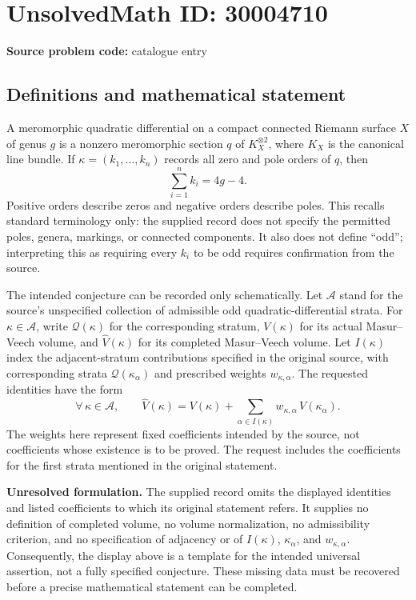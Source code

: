 \documentclass[11pt]{article}
\begin{document}
\section*{UnsolvedMath ID: 30004710}
\textbf{Source problem code:} catalogue entry
\subsection{Definitions and mathematical statement}
A meromorphic quadratic differential on a compact connected Riemann surface \(X\) of genus \(g\) is a nonzero meromorphic section \(q\) of \(K_X^{\otimes 2}\), where \(K_X\) is the canonical line bundle. If \(\kappa=(k_1,\ldots,k_n)\) records all zero and pole orders of \(q\), then
\[
\sum_{i=1}^{n} k_i=4g-4.
\]
Positive orders describe zeros and negative orders describe poles. This recalls standard terminology only: the supplied record does not specify the permitted poles, genera, markings, or connected components. It also does not define ``odd''; interpreting this as requiring every \(k_i\) to be odd requires confirmation from the source.

The intended conjecture can be recorded only schematically. Let \(\mathcal A\) stand for the source's unspecified collection of admissible odd quadratic-differential strata. For \(\kappa\in\mathcal A\), write \(\mathcal Q(\kappa)\) for the corresponding stratum, \(V(\kappa)\) for its actual Masur--Veech volume, and \(\widehat V(\kappa)\) for its completed Masur--Veech volume. Let \(I(\kappa)\) index the adjacent-stratum contributions specified in the original source, with corresponding strata \(\mathcal Q(\kappa_\alpha)\) and prescribed weights \(w_{\kappa,\alpha}\). The requested identities have the form
\[
\forall\,\kappa\in\mathcal A,\qquad
\widehat V(\kappa)
=
V(\kappa)+\sum_{\alpha\in I(\kappa)}
w_{\kappa,\alpha}\,V(\kappa_\alpha).
\]
The weights here represent fixed coefficients intended by the source, not coefficients whose existence is to be proved. The request includes the coefficients for the first strata mentioned in the original statement.

\textbf{Unresolved formulation.} The supplied record omits the displayed identities and listed coefficients to which its original statement refers. It supplies no definition of completed volume, no volume normalization, no admissibility criterion, and no specification of adjacency or of \(I(\kappa)\), \(\kappa_\alpha\), and \(w_{\kappa,\alpha}\). Consequently, the display above is a template for the intended universal assertion, not a fully specified conjecture. These missing data must be recovered before a precise mathematical statement can be completed.
\end{document}
